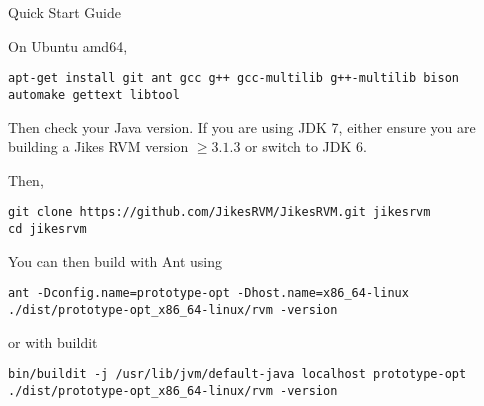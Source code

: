 \begin{chapter}{Quick Start Guide}
\label{cha:quickstartguide}

On Ubuntu amd64,

\begin{lstlisting}
apt-get install git ant gcc g++ gcc-multilib g++-multilib bison automake gettext libtool
\end{lstlisting}


Then check your Java version.  If you are using JDK 7, either ensure you are building a Jikes RVM version $\geq 3.1.3$ or switch to JDK 6.

Then, 
\begin{lstlisting}
git clone https://github.com/JikesRVM/JikesRVM.git jikesrvm
cd jikesrvm
\end{lstlisting}


You can then build with Ant using
\begin{lstlisting}
ant -Dconfig.name=prototype-opt -Dhost.name=x86_64-linux
./dist/prototype-opt_x86_64-linux/rvm -version
\end{lstlisting}

or with buildit

\begin{lstlisting}
bin/buildit -j /usr/lib/jvm/default-java localhost prototype-opt
./dist/prototype-opt_x86_64-linux/rvm -version
\end{lstlisting}

\end{chapter}

